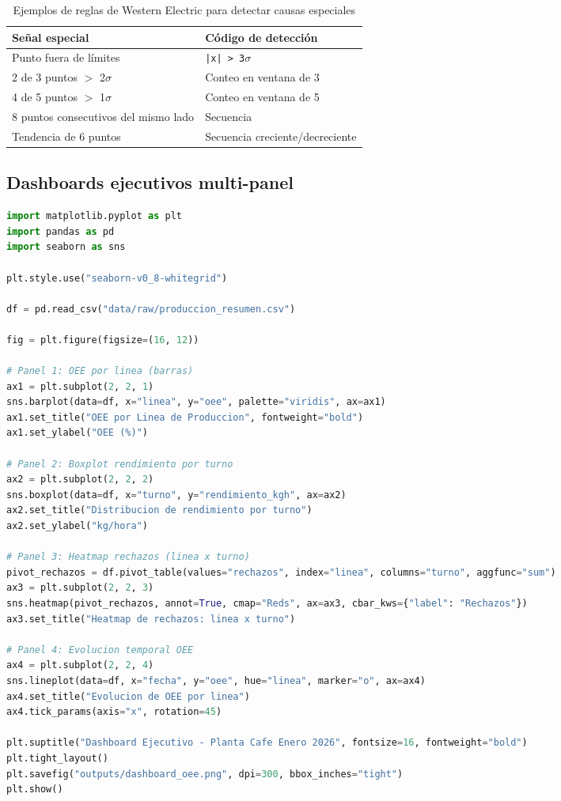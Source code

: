 \documentclass[11pt, a4paper]{article}
\begin{document}
\begin{table}[h]
\centering
\begin{tabular}{@{}ll@{}}
\toprule
\textbf{Señal especial} & \textbf{Código de detección} \\
\midrule
Punto fuera de límites & \texttt{|x| > 3$\sigma$} \\
2 de 3 puntos $>$ 2$\sigma$ & Conteo en ventana de 3 \\
4 de 5 puntos $>$ 1$\sigma$ & Conteo en ventana de 5 \\
8 puntos consecutivos del mismo lado & Secuencia \\
Tendencia de 6 puntos & Secuencia creciente/decreciente \\
\bottomrule
\end{tabular}
\caption{Ejemplos de reglas de Western Electric para detectar causas especiales}
\end{table}

\subsection{Dashboards ejecutivos multi-panel}

\begin{lstlisting}[language=Python, caption={Dashboard OEE de 4 paneles}, upquote=true]
import matplotlib.pyplot as plt
import pandas as pd
import seaborn as sns

plt.style.use("seaborn-v0_8-whitegrid")

df = pd.read_csv("data/raw/produccion_resumen.csv")

fig = plt.figure(figsize=(16, 12))

# Panel 1: OEE por linea (barras)
ax1 = plt.subplot(2, 2, 1)
sns.barplot(data=df, x="linea", y="oee", palette="viridis", ax=ax1)
ax1.set_title("OEE por Linea de Produccion", fontweight="bold")
ax1.set_ylabel("OEE (%)")

# Panel 2: Boxplot rendimiento por turno
ax2 = plt.subplot(2, 2, 2)
sns.boxplot(data=df, x="turno", y="rendimiento_kgh", ax=ax2)
ax2.set_title("Distribucion de rendimiento por turno")
ax2.set_ylabel("kg/hora")

# Panel 3: Heatmap rechazos (linea x turno)
pivot_rechazos = df.pivot_table(values="rechazos", index="linea", columns="turno", aggfunc="sum")
ax3 = plt.subplot(2, 2, 3)
sns.heatmap(pivot_rechazos, annot=True, cmap="Reds", ax=ax3, cbar_kws={"label": "Rechazos"})
ax3.set_title("Heatmap de rechazos: linea x turno")

# Panel 4: Evolucion temporal OEE
ax4 = plt.subplot(2, 2, 4)
sns.lineplot(data=df, x="fecha", y="oee", hue="linea", marker="o", ax=ax4)
ax4.set_title("Evolucion de OEE por linea")
ax4.tick_params(axis="x", rotation=45)

plt.suptitle("Dashboard Ejecutivo - Planta Cafe Enero 2026", fontsize=16, fontweight="bold")
plt.tight_layout()
plt.savefig("outputs/dashboard_oee.png", dpi=300, bbox_inches="tight")
plt.show()
\end{lstlisting}
\end{document}
